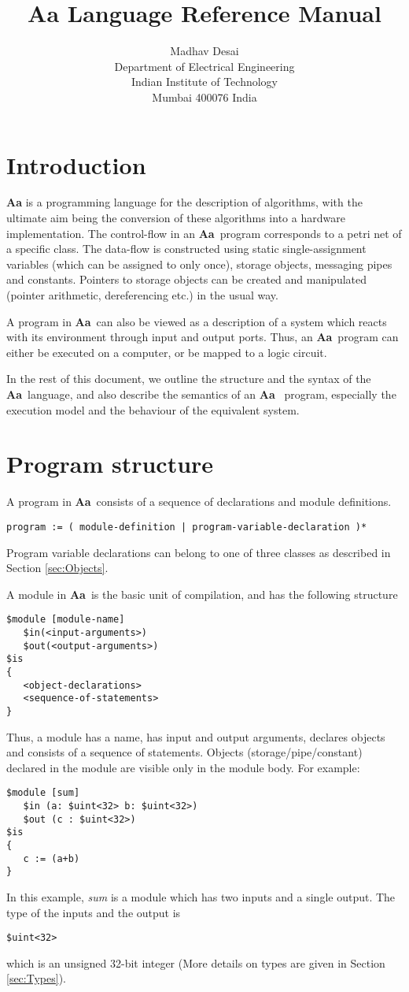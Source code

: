 \documentclass{article}
\title{Aa Language Reference Manual}
\author{Madhav Desai \\ Department of Electrical Engineering \\ Indian Institute of Technology \\
	Mumbai 400076 India}
\newcommand{\Aa}{{\bf Aa}~}
\begin{document}
\maketitle

\section{Introduction}

{\bf Aa} is a programming language for the 
description of algorithms, with the ultimate aim
being the conversion of these algorithms into 
a hardware implementation.   The control-flow
in an \Aa program corresponds to a petri net
of a specific class.
The data-flow is constructed using static
single-assignment variables (which can be assigned to only once),
storage objects, messaging pipes and constants.
Pointers to storage objects can be created
and manipulated (pointer arithmetic, dereferencing
etc.) in the usual way.  

A program in \Aa can also be viewed as a 
description of a system which reacts with 
its environment through input and output ports.
Thus, an \Aa program can either be executed on a 
computer, or be mapped to a logic circuit.

In the rest of this document, we outline the
structure and the syntax of the \Aa language,
and also describe the semantics of an \Aa
program, especially the execution model and
the behaviour of the equivalent system.


\section{Program structure}


A program in \Aa consists of a sequence of
declarations and module definitions.  
\begin{verbatim}
program := ( module-definition | program-variable-declaration )*
\end{verbatim}
Program variable declarations
can belong to one of three classes as described in Section \ref{sec:Objects}.

A module in \Aa is the basic unit of compilation, and
has the following structure
\begin{verbatim}
$module [module-name] 
   $in(<input-arguments>)
   $out(<output-arguments>)
$is
{
   <object-declarations>
   <sequence-of-statements>
}
\end{verbatim}
Thus, a module has a name, has input and output arguments,
declares objects and consists of a sequence of statements.
Objects (storage/pipe/constant) declared in the module are visible only in the
module body.   For example:
\begin{verbatim}
$module [sum] 
   $in (a: $uint<32> b: $uint<32>) 
   $out (c : $uint<32>)
$is
{
   c := (a+b)
}
\end{verbatim}
In this example, {\em sum} is 
a module which has two inputs and a single output.
The type of the inputs and the output is 
\begin{verbatim}
$uint<32>
\end{verbatim}
which is an unsigned 32-bit integer (More details
on types are given in Section \ref{sec:Types}).
\end{document}
